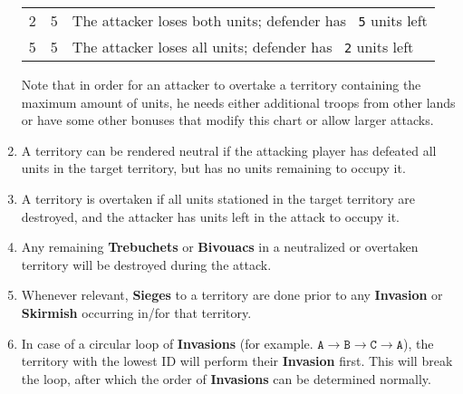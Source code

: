 \documentclass[10pt,openright,a4paper,openany]{article}
\newcommand{\num}[1]{\texttt{\color{purple} {#1}}}
\newcommand{\term}[1]{\textbf{\color{purple} #1}}
\begin{document}
\begin{enumerate}
\begin{tabular}{c|c|l}
		2 & 5 & The attacker loses both units; defender has \num{5} units left \\
		5 & 5 & The attacker loses all units; defender has \num{2} units left
	\end{tabular}
	Note that in order for an attacker to overtake a territory containing the maximum amount of units, he needs either additional troops from other lands or have some other bonuses that modify this chart or allow larger attacks.
	\item \label{rule:neutralization}A territory can be rendered neutral if the attacking player has defeated all units in the target territory, but has no units remaining to occupy it.
	\item A territory is overtaken if all units stationed in the target territory are destroyed, and the attacker has units left in the attack to occupy it.
  \item Any remaining \term{Trebuchets} or \term{Bivouacs} in a neutralized or overtaken territory will be destroyed during the attack.
	\item Whenever relevant, \term{Sieges} to a territory are done prior to any \term{Invasion} or \term{Skirmish} occurring in/for that territory.
	\item In case of a circular loop of \term{Invasions} (for example. $\texttt{A} \to \texttt{B} \to \texttt{C} \to \texttt{A}$), the territory with the lowest ID will perform their \term{Invasion} first. This will break the loop, after which the order of \term{Invasions} can be determined normally.

\end{enumerate}
\end{document}
